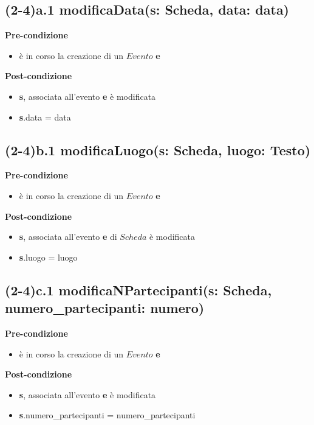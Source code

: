 \documentclass[12pt]{extarticle}
\begin{document}
\subsection*{(2-4)a.1 modificaData(s: Scheda, data: data)}

\textbf{Pre-condizione}
\begin{itemize}
  \item è in corso la creazione di un $Evento$ \textbf{e}
\end{itemize} 
\textbf{Post-condizione}
\begin{itemize}
  \item \textbf{s}, associata all'evento \textbf{e} è modificata
  \item \textbf{s}.data = data
\end{itemize} 

\subsection*{(2-4)b.1 modificaLuogo(s: Scheda, luogo: Testo)}

\textbf{Pre-condizione}
\begin{itemize}
  \item è in corso la creazione di un $Evento$ \textbf{e}
\end{itemize} 
\textbf{Post-condizione}
\begin{itemize}
  \item \textbf{s}, associata all'evento \textbf{e} di $Scheda$ è modificata
  \item \textbf{s}.luogo = luogo
\end{itemize} 

\subsection*{(2-4)c.1 modificaNPartecipanti(s: Scheda, numero\_partecipanti: numero)}

\textbf{Pre-condizione}
\begin{itemize}
  \item è in corso la creazione di un $Evento$ \textbf{e}
\end{itemize} 
\textbf{Post-condizione}
\begin{itemize}
  \item \textbf{s}, associata all'evento \textbf{e} è modificata
  \item \textbf{s}.numero\_partecipanti = numero\_partecipanti
\end{itemize}
\end{document}
